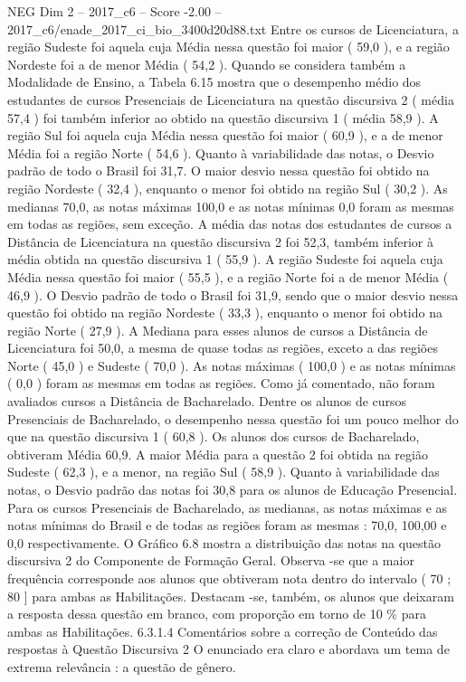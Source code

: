 \begin{textsample}{NEG Dim 2 – 2017\_c6 – Score -2.00 – 2017\_c6/enade\_2017\_ci\_bio\_3400d20d88.txt}
Entre os cursos de Licenciatura, a região Sudeste foi aquela cuja Média nessa questão foi maior ( 59,0 ), e a região Nordeste foi a de menor Média ( 54,2 ).
Quando se considera também a Modalidade de Ensino, a Tabela 6.15 mostra que o desempenho médio dos estudantes de cursos Presenciais de Licenciatura na questão discursiva 2 ( média 57,4 ) foi também inferior ao obtido na questão discursiva 1 ( média 58,9 ).
A região Sul foi aquela cuja Média nessa questão foi maior ( 60,9 ), e a de menor Média foi a região Norte ( 54,6 ).
Quanto à variabilidade das notas, o Desvio padrão de todo o Brasil foi 31,7.
O maior desvio nessa questão foi obtido na região Nordeste ( 32,4 ), enquanto o menor foi obtido na região Sul ( 30,2 ).
As medianas 70,0, as notas máximas 100,0 e as notas mínimas 0,0 foram as mesmas em todas as regiões, sem exceção.
A média das notas dos estudantes de cursos a Distância de Licenciatura na questão discursiva 2 foi 52,3, também inferior à média obtida na questão discursiva 1 ( 55,9 ).
A região Sudeste foi aquela cuja Média nessa questão foi maior ( 55,5 ), e a região Norte foi a de menor Média ( 46,9 ).
O Desvio padrão de todo o Brasil foi 31,9, sendo que o maior desvio nessa questão foi obtido na região Nordeste ( 33,3 ), enquanto o menor foi obtido na região Norte ( 27,9 ).
A Mediana para esses alunos de cursos a Distância de Licenciatura foi 50,0, a mesma de quase todas as regiões, exceto a das regiões Norte ( 45,0 ) e Sudeste ( 70,0 ).
As notas máximas ( 100,0 ) e as notas mínimas ( 0,0 ) foram as mesmas em todas as regiões.
Como já comentado, não foram avaliados cursos a Distância de Bacharelado.
Dentre os alunos de cursos Presenciais de Bacharelado, o desempenho nessa questão foi um pouco melhor do que na questão discursiva 1 ( 60,8 ).
Os alunos dos cursos de Bacharelado, obtiveram Média 60,9.
A maior Média para a questão 2 foi obtida na região Sudeste ( 62,3 ), e a menor, na região Sul ( 58,9 ).
Quanto à variabilidade das notas, o Desvio padrão das notas foi 30,8 para os alunos de Educação Presencial.
Para os cursos Presenciais de Bacharelado, as medianas, as notas máximas e as notas mínimas do Brasil e de todas as regiões foram as mesmas : 70,0, 100,00 e 0,0 respectivamente.
O Gráfico 6.8 mostra a distribuição das notas na questão discursiva 2 do Componente de Formação Geral.
Observa -se que a maior frequência corresponde aos alunos que obtiveram nota dentro do intervalo ( 70 ; 80 ] para ambas as Habilitações.
Destacam -se, também, os alunos que deixaram a resposta dessa questão em branco, com proporção em torno de 10 \% para ambas as Habilitações. 6.3.1.4 Comentários sobre a correção de Conteúdo das respostas à Questão Discursiva 2 O enunciado era claro e abordava um tema de extrema relevância : a questão de gênero.

\end{textsample}
